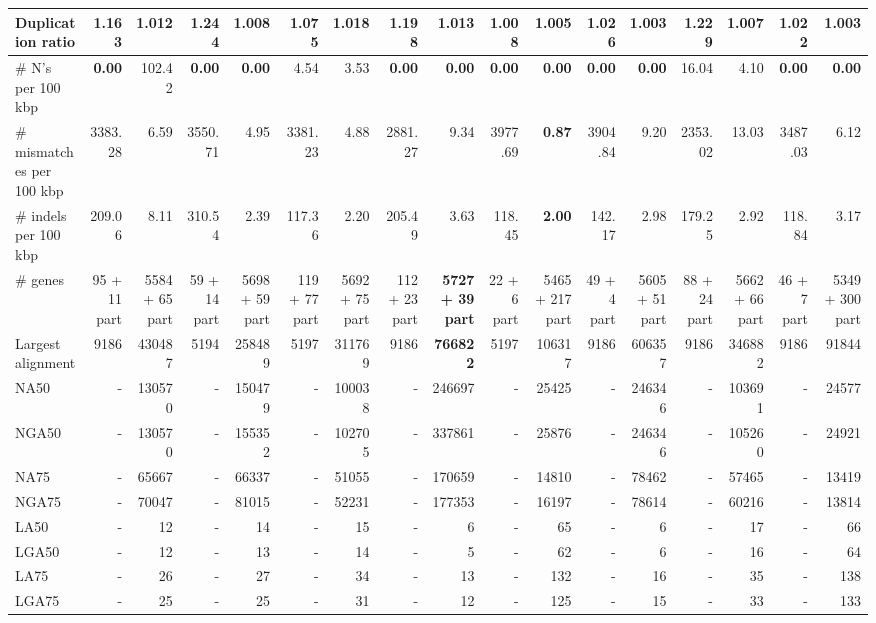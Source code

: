 \documentclass[12pt,a4paper]{article}
\begin{document}
\begin{table}[ht]
\begin{center}
\begin{tabular}{|l*{16}{|r}|}
Duplication ratio & 1.163 & 1.012 & 1.244 & 1.008 & 1.075 & 1.018 & 1.198 & 1.013 & 1.008 & 1.005 & 1.026 & {\bf 1.003} & 1.229 & 1.007 & 1.022 & {\bf 1.003} \\ \hline
\# N's per 100 kbp & {\bf 0.00} & 102.42 & {\bf 0.00} & {\bf 0.00} & 4.54 & 3.53 & {\bf 0.00} & {\bf 0.00} & {\bf 0.00} & {\bf 0.00} & {\bf 0.00} & {\bf 0.00} & 16.04 & 4.10 & {\bf 0.00} & {\bf 0.00} \\ \hline
\# mismatches per 100 kbp & 3383.28 & 6.59 & 3550.71 & 4.95 & 3381.23 & 4.88 & 2881.27 & 9.34 & 3977.69 & {\bf 0.87} & 3904.84 & 9.20 & 2353.02 & 13.03 & 3487.03 & 6.12 \\ \hline
\# indels per 100 kbp & 209.06 & 8.11 & 310.54 & 2.39 & 117.36 & 2.20 & 205.49 & 3.63 & 118.45 & {\bf 2.00} & 142.17 & 2.98 & 179.25 & 2.92 & 118.84 & 3.17 \\ \hline
\# genes & 95 + 11 part & 5584 + 65 part & 59 + 14 part & 5698 + 59 part & 119 + 77 part & 5692 + 75 part & 112 + 23 part & {\bf 5727 + 39 part} & 22 + 6 part & 5465 + 217 part & 49 + 4 part & 5605 + 51 part & 88 + 24 part & 5662 + 66 part & 46 + 7 part & 5349 + 300 part \\ \hline
Largest alignment & 9186 & 430487 & 5194 & 258489 & 5197 & 311769 & 9186 & {\bf 766822} & 5197 & 106317 & 9186 & 606357 & 9186 & 346882 & 9186 & 91844 \\ \hline
NA50 & - & 130570 & - & 150479 & - & 100038 & - & 246697 & - & 25425 & - & 246346 & - & 103691 & - & 24577 \\ \hline
NGA50 & - & 130570 & - & 155352 & - & 102705 & - & 337861 & - & 25876 & - & 246346 & - & 105260 & - & 24921 \\ \hline
NA75 & - & 65667 & - & 66337 & - & 51055 & - & 170659 & - & 14810 & - & 78462 & - & 57465 & - & 13419 \\ \hline
NGA75 & - & 70047 & - & 81015 & - & 52231 & - & 177353 & - & 16197 & - & 78614 & - & 60216 & - & 13814 \\ \hline
LA50 & - & 12 & - & 14 & - & 15 & - & 6 & - & 65 & - & 6 & - & 17 & - & 66 \\ \hline
LGA50 & - & 12 & - & 13 & - & 14 & - & 5 & - & 62 & - & 6 & - & 16 & - & 64 \\ \hline
LA75 & - & 26 & - & 27 & - & 34 & - & 13 & - & 132 & - & 16 & - & 35 & - & 138 \\ \hline
LGA75 & - & 25 & - & 25 & - & 31 & - & 12 & - & 125 & - & 15 & - & 33 & - & 133 \\ \hline
\end{tabular}
\end{center}
\end{table}
\end{document}

